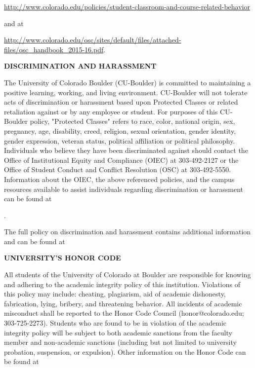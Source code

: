 \documentclass[11pt]{article}
\begin{document}
{\footnotesize \url{http://www.colorado.edu/policies/student-classroom-and-course-related-behavior} }  

and at

\noindent
{\footnotesize\url{http://www.colorado.edu/osc/sites/default/files/attached-files/osc_handbook_2015-16.pdf}. }


\bigskip
\textbf{\normalsize  DISCRIMINATION AND HARASSMENT}

The University of Colorado Boulder (CU-Boulder) is committed to maintaining a positive learning, working, and living environment. CU-Boulder will not tolerate acts of discrimination or harassment based upon Protected Classes or related retaliation against or by any employee or student. For purposes of this CU-Boulder policy, "Protected Classes" refers to race, color, national origin, sex, pregnancy, age, disability, creed, religion, sexual orientation, gender identity, gender expression, veteran status, political affiliation or political philosophy. Individuals who believe they have been discriminated against should contact the Office of Institutional Equity and Compliance (OIEC) at 303-492-2127 or the Office of Student Conduct and Conflict Resolution (OSC) at 303-492-5550. Information about the OIEC, the above referenced policies, and the campus resources available to assist individuals regarding discrimination or harassment can be found at 

.  

The full policy on discrimination and harassment contains additional information and can be found at 



\bigskip
\textbf{\normalsize UNIVERSITY'S HONOR CODE}

All students of the University of Colorado at Boulder are
responsible for knowing and adhering to the academic integrity
policy of this institution. Violations of this policy may include:
cheating, plagiarism, aid of academic dishonesty, fabrication,
lying, bribery, and threatening behavior.  All incidents of academic
misconduct shall be reported to the Honor Code Council
(honor@colorado.edu; 303-725-2273). Students who are found to be in
violation of the academic integrity policy will be subject to both
academic sanctions from the faculty member and non-academic
sanctions (including but not limited to university probation,
suspension, or expulsion). Other information on the Honor Code can
be found at 
\end{document}
